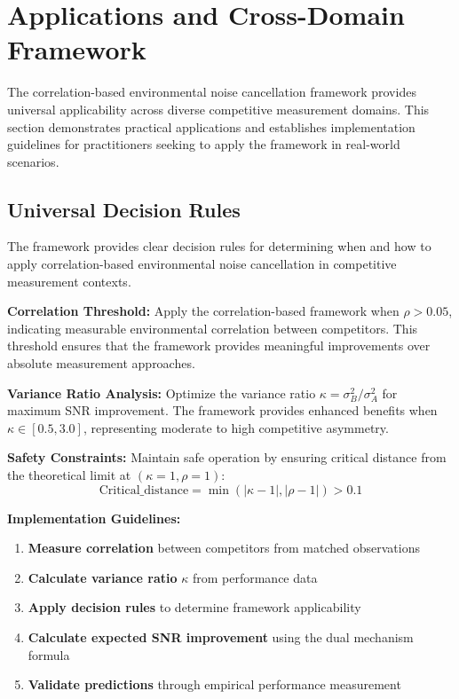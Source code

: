 \section{Applications and Cross-Domain Framework}

The correlation-based environmental noise cancellation framework provides universal applicability across diverse competitive measurement domains. This section demonstrates practical applications and establishes implementation guidelines for practitioners seeking to apply the framework in real-world scenarios.

\subsection{Universal Decision Rules}

The framework provides clear decision rules for determining when and how to apply correlation-based environmental noise cancellation in competitive measurement contexts.

\textbf{Correlation Threshold:}
Apply the correlation-based framework when $\rho > 0.05$, indicating measurable environmental correlation between competitors. This threshold ensures that the framework provides meaningful improvements over absolute measurement approaches.

\textbf{Variance Ratio Analysis:}
Optimize the variance ratio $\kappa = \sigma_B^2/\sigma_A^2$ for maximum SNR improvement. The framework provides enhanced benefits when $\kappa \in [0.5, 3.0]$, representing moderate to high competitive asymmetry.

\textbf{Safety Constraints:}
Maintain safe operation by ensuring critical distance from the theoretical limit at $(\kappa=1, \rho=1)$:
\begin{equation}
\text{Critical\_distance} = \min(|\kappa - 1|, |\rho - 1|) > 0.1
\end{equation}

\textbf{Implementation Guidelines:}
\begin{enumerate}
    \item \textbf{Measure correlation} between competitors from matched observations
    \item \textbf{Calculate variance ratio} $\kappa$ from performance data
    \item \textbf{Apply decision rules} to determine framework applicability
    \item \textbf{Calculate expected SNR improvement} using the dual mechanism formula
    \item \textbf{Validate predictions} through empirical performance measurement
\end{enumerate}

